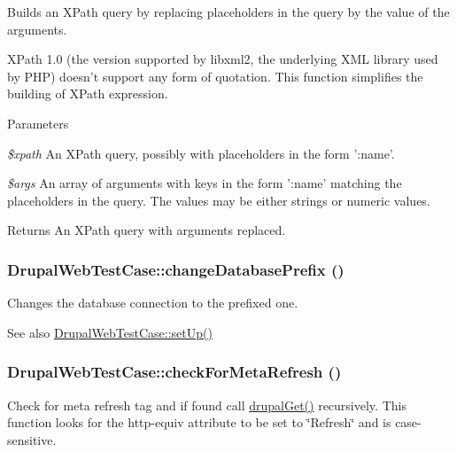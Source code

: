 Builds an XPath query by replacing placeholders in the query by the value of the arguments.

XPath 1.0 (the version supported by libxml2, the underlying XML library used by PHP) doesn't support any form of quotation. This function simplifies the building of XPath expression.


\begin{DoxyParams}{Parameters}
\item[{\em \$xpath}]An XPath query, possibly with placeholders in the form ':name'. \item[{\em \$args}]An array of arguments with keys in the form ':name' matching the placeholders in the query. The values may be either strings or numeric values. \end{DoxyParams}
\begin{DoxyReturn}{Returns}
An XPath query with arguments replaced. 
\end{DoxyReturn}
\hypertarget{classDrupalWebTestCase_aaf79c7de4222e244e8b6b6228ba1278f}{
\subsubsection[{changeDatabasePrefix}]{\setlength{\rightskip}{0pt plus 5cm}DrupalWebTestCase::changeDatabasePrefix ()}}
\label{classDrupalWebTestCase_aaf79c7de4222e244e8b6b6228ba1278f}
Changes the database connection to the prefixed one.

\begin{DoxySeeAlso}{See also}
\hyperlink{classDrupalWebTestCase_a110ecf5deb57ee6a908617360c1f6ec4}{DrupalWebTestCase::setUp()} 
\end{DoxySeeAlso}
\hypertarget{classDrupalWebTestCase_a639bf5d4e0892c7d3659c224a609183c}{
\subsubsection[{checkForMetaRefresh}]{\setlength{\rightskip}{0pt plus 5cm}DrupalWebTestCase::checkForMetaRefresh ()}}
\label{classDrupalWebTestCase_a639bf5d4e0892c7d3659c224a609183c}
Check for meta refresh tag and if found call \hyperlink{classDrupalWebTestCase_ae282e9e10195fb8dad8a49d1b35e31c9}{drupalGet()} recursively. This function looks for the http-\/equiv attribute to be set to \char`\"{}Refresh\char`\"{} and is case-\/sensitive.

